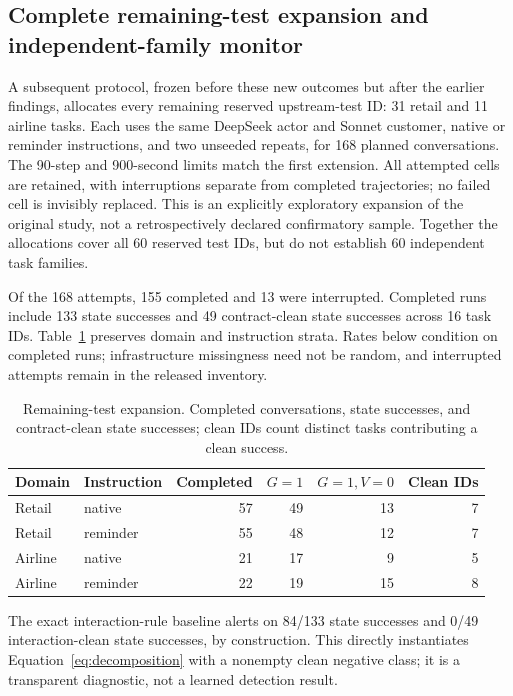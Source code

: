 \subsection{Complete remaining-test expansion and independent-family monitor}
\label{sec:replication}
A subsequent protocol, frozen before these new outcomes but after the earlier findings, allocates every remaining reserved upstream-test ID: 31 retail and 11 airline tasks. Each uses the same DeepSeek actor and Sonnet customer, native or reminder instructions, and two unseeded repeats, for 168 planned conversations. The 90-step and 900-second limits match the first extension. All attempted cells are retained, with interruptions separate from completed trajectories; no failed cell is invisibly replaced. This is an explicitly exploratory expansion of the original study, not a retrospectively declared confirmatory sample. Together the allocations cover all 60 reserved test IDs, but do not establish 60 independent task families.

Of the 168 attempts, 155 completed and 13 were interrupted. Completed runs include 133 state successes and 49 contract-clean state successes across 16 task IDs. Table~\ref{tab:replication-cohort} preserves domain and instruction strata. Rates below condition on completed runs; infrastructure missingness need not be random, and interrupted attempts remain in the released inventory.

\begin{table}[t]\centering\small
\caption{Remaining-test expansion. Completed conversations, state successes, and contract-clean state successes; clean IDs count distinct tasks contributing a clean success.}\label{tab:replication-cohort}
\begin{tabular}{llrrrr}
\toprule
Domain & Instruction & Completed & $G=1$ & $G=1,V=0$ & Clean IDs\\
\midrule
Retail & native & 57 & 49 & 13 & 7\\
Retail & reminder & 55 & 48 & 12 & 7\\
Airline & native & 21 & 17 & 9 & 5\\
Airline & reminder & 22 & 19 & 15 & 8\\
\bottomrule
\end{tabular}
\end{table}
The exact interaction-rule baseline alerts on 84/133 state successes and 0/49 interaction-clean state successes, by construction. This directly instantiates Equation~\ref{eq:decomposition} with a nonempty clean negative class; it is a transparent diagnostic, not a learned detection result.

